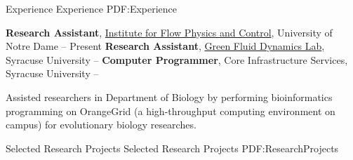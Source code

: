 \documentclass[letterpaper,MMMyyyy,nonstopmode]{simpleresumecv}
\begin{document}
\begin{Body}

\Section
{Experience}
{Experience}
{PDF:Experience}

    \Entry
    \textbf{Research Assistant},
    \href{http://www.nd.edu/~flowpac/}{Institute for Flow Physics and Control}, University of Notre Dame
    \hfill
     -- Present
        \Gap
    \Entry
    \textbf{Research Assistant},
    \href{http://greenfluids.syr.edu/}{Green Fluid Dynamics Lab}, Syracuse University
    \hfill
     -- 
        \Gap
    \Entry
    \textbf{Computer Programmer},
    Core Infrastructure Services, Syracuse University
    \hfill
     -- 
        \begin{Detail}
            \BulletItem
            Assisted researchers in Department of Biology by performing bioinformatics programming on OrangeGrid (a high-throughput computing environment on campus) for evolutionary biology researches.
        \end{Detail}


\Section
{Selected Research Projects}
{Selected Research Projects}
{PDF:ResearchProjects}


\end{Body}
\end{document}
